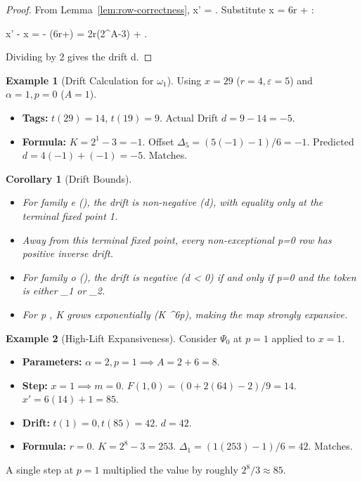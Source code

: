 \documentclass[11pt,letterpaper]{amsart}
\def\mathrm#1{#1}%
\def\({}%
\def\){}%
\def\[{ }%
\def\]{ }%
\theoremstyle{definition}
\newtheorem{example}{Example}
\theoremstyle{plain}
\theoremstyle{plain}
\newtheorem{corollary}[theorem]{Corollary}
\theoremstyle{remark}
\begin{document}
\begin{proof}
From Lemma~\ref{lem:row-correctness}, \(x' = \).
Substitute \(x = 6r + \varepsilon\):
\[
x' - x \;=\;  - (6r+\varepsilon)
\;=\; 2r(2^{A}-3) + .
\]
Dividing by 2 gives the drift \(d\).
\end{proof}

\begin{example}[Drift Calculation for $\omega_1$]
Using $x=29$ ($r=4, \varepsilon=5$) and $\alpha=1, p=0$ ($A=1$).
\begin{itemize}
    \item \textbf{Tags:} $t(29) = 14$, $t(19) = 9$. Actual Drift $d = 9-14 = -5$.
    \item \textbf{Formula:} $K = 2^1 - 3 = -1$.
    Offset $\Delta_5 = (5(-1) - 1)/6 = -1$.
    Predicted $d = 4(-1) + (-1) = -5$. Matches.
\end{itemize}
\end{example}

\begin{corollary}[Drift Bounds]
\label{cor:drift-bounds}
\begin{itemize}
    \item For family \(\mathrm{e}\) (\(\)), the drift is non-negative (\(d\)), with equality only at the terminal fixed point \(1\).
    \item Away from this terminal fixed point, every non-exceptional \(p=0\) row has positive inverse drift.
    \item For family \(\mathrm{o}\) (\(\)), the drift is negative (\(d < 0\)) if and only if \(p=0\) and the token is either \(\omega_{1}\) or \(\Omega_{2}\).
    \item For \(p \), \(K\) grows exponentially (\(K ^{6p}\)), making the map strongly expansive.
\end{itemize}
\end{corollary}

\begin{example}[High-Lift Expansiveness]
Consider $\Psi_0$ at $p=1$ applied to $x=1$.
\begin{itemize}
    \item \textbf{Parameters:} $\alpha=2, p=1 \implies A = 2 + 6 = 8$.
    \item \textbf{Step:} $x=1 \implies m=0$. $F(1,0) = (0 + 2(64) - 2)/9 = 14$.
    $x' = 6(14) + 1 = 85$.
    \item \textbf{Drift:} $t(1)=0, t(85)=42$. $d = 42$.
    \item \textbf{Formula:} $r=0$. $K = 2^8 - 3 = 253$.
    $\Delta_1 = (1(253)-1)/6 = 42$. Matches.
\end{itemize}
A single step at $p=1$ multiplied the value by roughly $2^8/3 \approx 85$.
\end{example}
\end{document}
